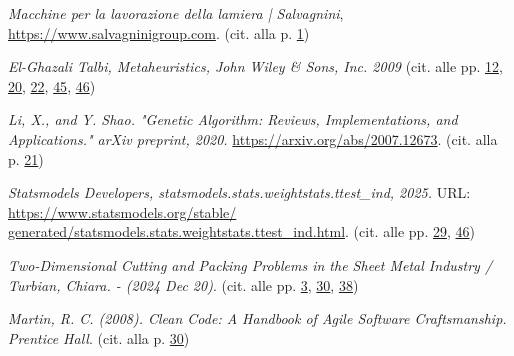 \cleardoublepage

\hypertarget{bibliografia}{}

\nocite{*}

\printbibliography[heading=subbibliography,title={Riferimenti bibliografici},type=book]

\printbibliography[heading=subbibliography,title={Siti web consultati},type=online]






\begin{thebibliography}{1}

\emph{Macchine per la lavorazione della lamiera | Salvagnini}, \url{https://www.salvagninigroup.com}. (cit. alla p. \hyperlink{salvagnini}{1})

\emph{El-Ghazali Talbi, Metaheuristics, John Wiley \& Sons, Inc. 2009} (cit. alle pp. \hyperlink{metaeuristiche}{12}, \hyperlink{elementi}{20}, \hyperlink{og}{22}, \hyperlink{gls2}{45}, \hyperlink{gls2}{46})

\bibitem{} 
\emph{Li, X., and Y. Shao. "Genetic Algorithm: Reviews, Implementations, and Applications." arXiv preprint, 2020.} \url{https://arxiv.org/abs/2007.12673}. (cit. alla p. \hyperlink{ga}{21})

\bibitem{} 
\emph{Statsmodels Developers, statsmodels.stats.weightstats.ttest\_ind, 2025.} URL: \url{https://www.statsmodels.org/stable/
generated/statsmodels.stats.weightstats.ttest_ind.html}. (cit. alle pp. \hyperlink{ttest}{29}, \hyperlink{gls4}{46})

\bibitem{}
\emph{Two-Dimensional Cutting and Packing Problems in the Sheet Metal Industry / Turbian, Chiara. - (2024 Dec 20)}. (cit. alle pp. \hyperlink{chiara}{3}, \hyperlink{chiara2}{30}, \hyperlink{chiara3}{38})

\bibitem{}
\emph{Martin, R. C. (2008). Clean Code: A Handbook of Agile Software Craftsmanship. Prentice Hall}. (cit. alla p. \hyperlink{cleancode}{30})

\end{thebibliography}